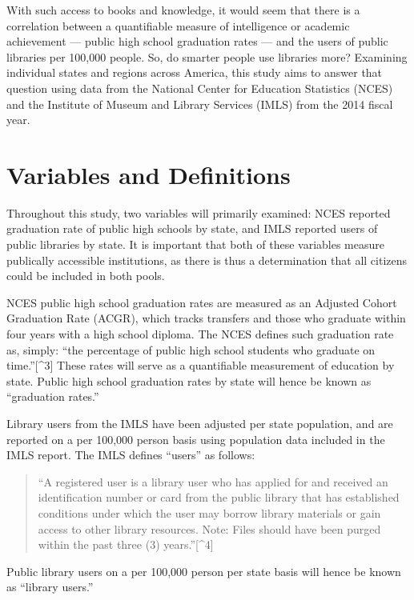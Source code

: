 \documentclass[12pt,]{article}
\begin{document}
With such access to books and knowledge, it would seem that there is a
correlation between a quantifiable measure of intelligence or academic
achievement --- public high school graduation rates --- and the users of
public libraries per 100,000 people. So, do smarter people use libraries
more? Examining individual states and regions across America, this study
aims to answer that question using data from the National Center for
Education Statistics (NCES) and the Institute of Museum and Library
Services (IMLS) from the 2014 fiscal year.

\section{Variables and Definitions}\label{variables-and-definitions}

Throughout this study, two variables will primarily examined: NCES
reported graduation rate of public high schools by state, and IMLS
reported users of public libraries by state. It is important that both
of these variables measure publically accessible institutions, as there
is thus a determination that all citizens could be included in both
pools.

NCES public high school graduation rates are measured as an Adjusted
Cohort Graduation Rate (ACGR), which tracks transfers and those who
graduate within four years with a high school diploma. The NCES defines
such graduation rate as, simply: ``the percentage of public high school
students who graduate on time.''{[}\^{}3{]} These rates will serve as a
quantifiable measurement of education by state. Public high school
graduation rates by state will hence be known as ``graduation rates.''

Library users from the IMLS have been adjusted per state population, and
are reported on a per 100,000 person basis using population data
included in the IMLS report. The IMLS defines ``users'' as follows:

\begin{quote}
``A registered user is a library user who has applied for and received
an identification number or card from the public library that has
established conditions under which the user may borrow library materials
or gain access to other library resources. Note: Files should have been
purged within the past three (3) years.''{[}\^{}4{]}
\end{quote}

Public library users on a per 100,000 person per state basis will hence
be known as ``library users.''
\end{document}
